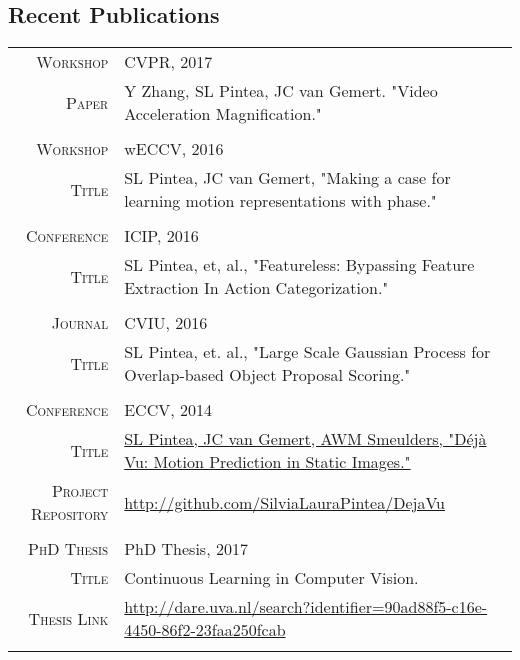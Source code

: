 \documentclass[a4paper, oneside, final]{scrartcl}
\newcommand{\gray}{\rowcolor[gray]{.90}}
\begin{document}
\begin{center}
		\section{Recent Publications}
		\begin{tabular}{r@{\hskip 0.3in}p{11.3cm}}
			\gray \textsc{Workshop} & CVPR, 2017\\
			\textsc{Paper}			& Y Zhang, SL Pintea, JC van Gemert. "Video Acceleration Magnification."\\ 
			\multicolumn{2}{c}{}\\
			\gray \textsc{Workshop} & wECCV, 2016\\
			\textsc{Title}			& SL Pintea, JC van Gemert, "Making a case for learning motion representations with phase."\\ 
			\multicolumn{2}{c}{}\\
			\gray \textsc{Conference}    & ICIP, 2016\\ 
					\textsc{Title}		 & SL Pintea, et, al., "Featureless: Bypassing Feature Extraction In Action Categorization."\\
			\multicolumn{2}{c}{}\\
			\gray \textsc{Journal}       & CVIU, 2016\\
				\textsc{Title}			 & SL Pintea, et. al., "Large Scale Gaussian Process for Overlap-based Object Proposal Scoring."\\	
			\multicolumn{2}{c}{}\\
			\gray \textsc{Conference}   & ECCV, 2014\\
				\textsc{Title}			& \href{https://staff.fnwi.uva.nl/s.l.pintea/dejavu/}{SL Pintea, JC van Gemert, AWM Smeulders, "D\'{e}j\`{a} Vu: Motion Prediction in Static Images."}\\	
			\textsc{Project Repository}  & \small\href{http://github.com/SilviaLauraPintea/DejaVu}
				{http://github.com/SilviaLauraPintea/DejaVu}\\ 
			\multicolumn{2}{c}{}\\
			\gray \textsc{PhD Thesis} & PhD Thesis, 2017\\
			\textsc{Title}			  & Continuous Learning in Computer Vision.\\ 
			\textsc{Thesis Link}      & \small\href{http://dare.uva.nl/search?identifier=90ad88f5-c16e-4450-86f2-23faa250fcab}
					{http://dare.uva.nl/search?identifier=90ad88f5-c16e-4450-86f2-23faa250fcab}\\
			\multicolumn{2}{c}{}\\
		\end{tabular}

\end{center}
\end{document}
